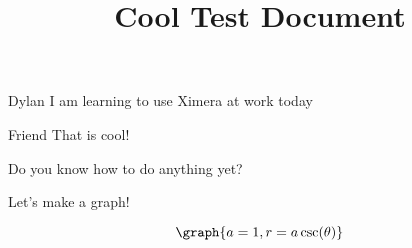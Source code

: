 \documentclass{ximera}
\title{Cool Test Document}
\begin{document}
\begin{dialogue}
\item[Dylan] I am learning to use Ximera at work today
\item[Friend] That is cool! 
\end{dialogue}

\begin{question}

Do you know how to do anything yet?
\begin{multipleChoice}




\end{multipleChoice}

\end{question}

Let's make a graph!

\[
\graph{a=1,r=a \csc(\theta)}
\]
\end{document}
